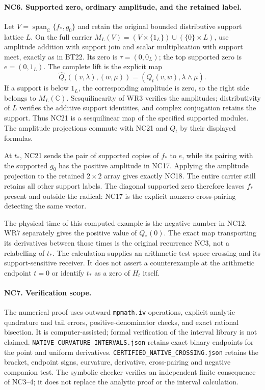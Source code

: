 \paragraph{NC6. Supported zero, ordinary amplitude, and the retained label.}
Let $V=\operatorname{span}_{\mathbb C}\{f_*,g_0\}$ and retain the
original bounded distributive support lattice $L$. On the full
carrier $M_L(V)=(V\times\{1_L\})\cup(\{0\}\times L)$, use amplitude
addition with support join and scalar multiplication with support
meet, exactly as in BT22. Its zero is $\tau=(0,0_L)$; the top
supported zero is $e=(0,1_L)$. The complete lift is the explicit map
\[
 \widehat Q_t((v,\lambda),(w,\mu))
       =(Q_t(v,w),\lambda\wedge\mu).
 \tag{NC21}
\]
If a support is below $1_L$, the corresponding amplitude is zero,
so the right side belongs to $M_L(\mathbb C)$. Sesquilinearity
of WR3 verifies the amplitudes; distributivity of $L$ verifies
the additive support identities, and complex conjugation retains
the support. Thus NC21 is a sesquilinear map of the specified
supported modules. The amplitude projections commute with NC21
and $Q_t$ by their displayed formulas.

At $t_*$, NC21 sends the pair of supported copies of $f_*$ to $e$,
while its pairing with the supported $g_0$ has the positive amplitude
in NC17. Applying the amplitude projection to the retained
$2\times2$ array gives exactly NC18. The entire carrier still retains
all other support labels. The diagonal supported zero therefore
leaves $f_*$ present and outside the radical: NC17 is the explicit
nonzero cross-pairing detecting the same vector.

The physical time of this computed example is the negative number
in NC12. WR7 separately gives the positive value of $Q_*(0)$.
The exact map transporting its derivatives between those times is
the original recurrence NC3, not a relabelling of $t_*$. The
calculation supplies an arithmetic test-space crossing and its
support-sensitive receiver. It does not assert a counterexample
at the arithmetic endpoint $t=0$ or identify $t_*$ as a zero of
$H_t$ itself.

\paragraph{NC7. Verification scope.}
The numerical proof uses outward \texttt{mpmath.iv} operations,
explicit analytic quadrature and tail errors, positive-denominator
checks, and exact rational bisection. It is computer-assisted;
formal verification of the interval library is not claimed.
\texttt{NATIVE\_CURVATURE\_INTERVALS.json} retains exact binary
endpoints for the point and uniform derivatives.
\texttt{CERTIFIED\_NATIVE\_CROSSING.json} retains the bracket,
endpoint signs, curvature, derivative, cross-pairing and negative
companion test. The symbolic checker verifies an independent
finite consequence of NC3--4; it does not replace the analytic
proof or the interval calculation.

